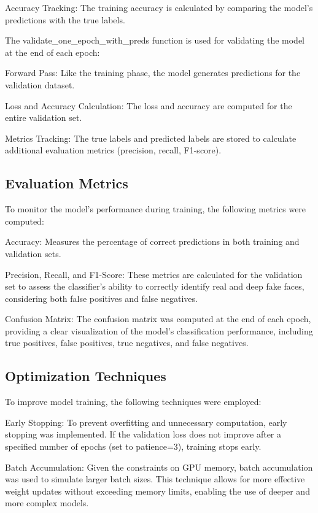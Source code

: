 \documentclass[12pt]{article}
\begin{document}
Accuracy Tracking: The training accuracy is calculated by comparing the
model's predictions with the true labels. 

The validate\_one\_epoch\_with\_preds function is used for validating the
model at the end of each epoch:

Forward Pass: Like the training phase, the model generates predictions
for the validation dataset.

Loss and Accuracy Calculation: The loss and accuracy are computed for
the entire validation set.

Metrics Tracking: The true labels and predicted labels are stored to
calculate additional evaluation metrics (precision, recall, F1-score).

    \subsection{Evaluation Metrics}\label{evaluation-metrics}

    To monitor the model's performance during training, the following
metrics were computed:

Accuracy: Measures the percentage of correct predictions in both
training and validation sets.

Precision, Recall, and F1-Score: These metrics are calculated for the
validation set to assess the classifier's ability to correctly identify
real and deep fake faces, considering both false positives and false
negatives.

Confusion Matrix: The confusion matrix was computed at the end of each
epoch, providing a clear visualization of the model's classification
performance, including true positives, false positives, true negatives,
and false negatives.

    \subsection{Optimization Techniques}\label{optimization-techniques}

    To improve model training, the following techniques were employed:

Early Stopping: To prevent overfitting and unnecessary computation,
early stopping was implemented. If the validation loss does not improve
after a specified number of epochs (set to patience=3), training stops
early.

Batch Accumulation: Given the constraints on GPU memory, batch
accumulation was used to simulate larger batch sizes. This technique
allows for more effective weight updates without exceeding memory
limits, enabling the use of deeper and more complex models.
\end{document}

